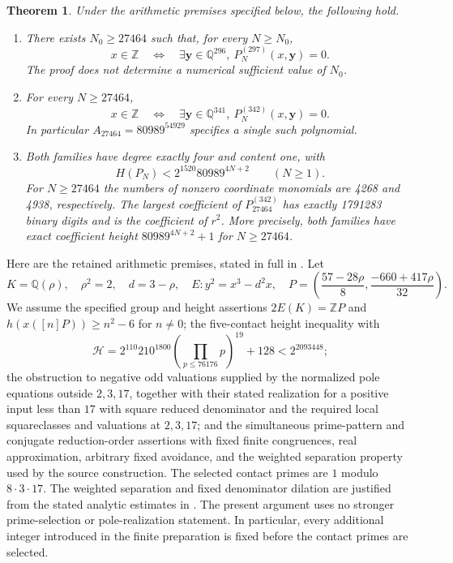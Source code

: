 \documentclass[11pt,a4paper]{article}
\newtheorem{theorem}{Theorem}[section]
\theoremstyle{remark}\newtheorem{remark}[theorem]{Remark}
\newcommand{\Q}{\mathbb Q}\newcommand{\Z}{\mathbb Z}\newcommand{\HH}{\mathcal H}
\begin{document}
\begin{theorem}\label{thm:main}
Under the arithmetic premises specified below, the following hold.
\begin{enumerate}
\item There exists $N_0\ge27464$ such that, for every $N\ge N_0$,
\[
 x\in\Z\quad\Longleftrightarrow\quad
 \exists\boldsymbol y\in\Q^{296},\ P_N^{(297)}(x,\boldsymbol y)=0.
\]
The proof does not determine a numerical sufficient value of $N_0$.
\item For every $N\ge27464$,
\[
 x\in\Z\quad\Longleftrightarrow\quad
 \exists\boldsymbol y\in\Q^{341},\ P_N^{(342)}(x,\boldsymbol y)=0.
\]
In particular $A_{27464}=80989^{54929}$ specifies a single such polynomial.
\item Both families have degree exactly four and content one, with
\[
 H(P_N)<2^{1520}80989^{4N+2}\qquad(N\ge1).
\]
For $N\ge27464$ the numbers of nonzero coordinate monomials are 4268
and 4938, respectively. The largest coefficient of $P_{27464}^{(342)}$
has exactly 1791283 binary digits and is the coefficient of $r^2$.
More precisely, both families have exact coefficient height
$80989^{4N+2}+1$ for $N\ge27464$.
\end{enumerate}
\end{theorem}

Here are the retained arithmetic premises, stated in full in
\cite[Section~2]{Source}. Let
\[
 K=\Q(\rho),\quad \rho^2=2,\quad d=3-\rho,\quad
 E:y^2=x^3-d^2x,\quad
 P=\left(\frac{57-28\rho}{8},\frac{-660+417\rho}{32}\right).
\]
We assume the specified group and height assertions
$2E(K)=\Z P$ and $h(x([n]P))\ge n^2-6$ for $n\ne0$;
the five-contact height inequality with
\[
 \HH=2^{110}210^{1800}\left(\prod_{p\le76176}p\right)^{19}+128
 <2^{2093448};
\]
the obstruction to negative odd valuations supplied by the normalized
pole equations outside $2,3,17$, together with their stated realization
for a positive input less than $17$ with square reduced denominator and
the required local squareclasses and valuations at $2,3,17$; and the
simultaneous prime-pattern and conjugate reduction-order assertions with
fixed finite congruences, real approximation, arbitrary fixed avoidance,
and the weighted separation property used by the source construction.
The selected contact primes are $1$ modulo $8\cdot3\cdot17$.
The weighted separation and fixed denominator dilation are justified
from the stated analytic estimates in \cite{Selection}. The present argument
uses no stronger prime-selection or pole-realization statement. In particular, every additional integer introduced in the
finite preparation is fixed before the contact primes are selected.
\end{document}
